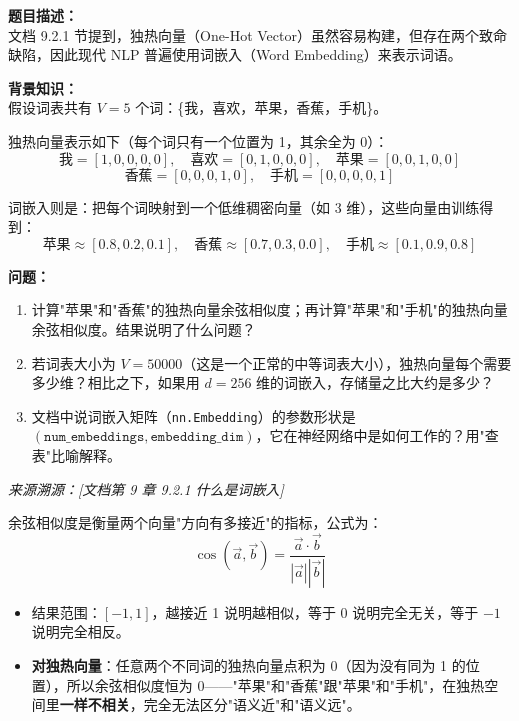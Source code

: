 \documentclass[a4paper,11pt]{ctexart}
\begin{document}
\begin{problembox}
    \textbf{题目描述：}\\
    文档 9.2.1 节提到，独热向量（One-Hot Vector）虽然容易构建，但存在两个致命缺陷，因此现代 NLP 普遍使用词嵌入（Word Embedding）来表示词语。

    \vspace{0.2cm}
    \textbf{背景知识：}\\
    假设词表共有 $V=5$ 个词：\{我，喜欢，苹果，香蕉，手机\}。

    独热向量表示如下（每个词只有一个位置为 1，其余全为 0）：
    \[
    \text{我} = [1,0,0,0,0], \quad \text{喜欢} = [0,1,0,0,0], \quad \text{苹果} = [0,0,1,0,0]
    \]
    \[
    \text{香蕉} = [0,0,0,1,0], \quad \text{手机} = [0,0,0,0,1]
    \]

    词嵌入则是：把每个词映射到一个低维稠密向量（如 3 维），这些向量由训练得到：
    \[
    \text{苹果} \approx [0.8, 0.2, 0.1], \quad \text{香蕉} \approx [0.7, 0.3, 0.0], \quad \text{手机} \approx [0.1, 0.9, 0.8]
    \]

    \vspace{0.2cm}
    \textbf{问题：}
    \begin{enumerate}[(1)]
        \item 计算"苹果"和"香蕉"的独热向量余弦相似度；再计算"苹果"和"手机"的独热向量余弦相似度。结果说明了什么问题？
        \item 若词表大小为 $V=50000$（这是一个正常的中等词表大小），独热向量每个需要多少维？相比之下，如果用 $d=256$ 维的词嵌入，存储量之比大约是多少？
        \item 文档中说词嵌入矩阵（\texttt{nn.Embedding}）的参数形状是 $(\texttt{num\_embeddings}, \texttt{embedding\_dim})$，它在神经网络中是如何工作的？用"查表"比喻解释。
    \end{enumerate}

    \vspace{0.2cm}
    {\color{gray}\small\textit{来源溯源：[文档第 9 章 9.2.1 什么是词嵌入]}}
\end{problembox}

\begin{beginnerbox}
    余弦相似度是衡量两个向量"方向有多接近"的指标，公式为：
    \[
    \cos(\vec{a}, \vec{b}) = \frac{\vec{a} \cdot \vec{b}}{|\vec{a}||\vec{b}|}
    \]
    \begin{itemize}
        \item 结果范围：$[-1, 1]$，越接近 1 说明越相似，等于 0 说明完全无关，等于 $-1$ 说明完全相反。
        \item \textbf{对独热向量}：任意两个不同词的独热向量点积为 0（因为没有同为 1 的位置），所以余弦相似度恒为 0——"苹果"和"香蕉"跟"苹果"和"手机"，在独热空间里\textbf{一样不相关}，完全无法区分"语义近"和"语义远"。
    \end{itemize}
\end{beginnerbox}
\end{document}
